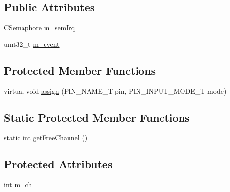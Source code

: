\subsection*{Public Attributes}
\begin{DoxyCompactItemize}
\item 
\hyperlink{class_c_semaphore}{C\-Semaphore} \hyperlink{class_c_pin_i_n_t_a183f478d30ac65d5a3e85c7939db044e}{m\-\_\-sem\-Irq}
\item 
uint32\-\_\-t \hyperlink{class_c_pin_i_n_t_a53b3ac0896504d345f4b6093cb22f3f3}{m\-\_\-event}
\end{DoxyCompactItemize}
\subsection*{Protected Member Functions}
\begin{DoxyCompactItemize}
\item 
virtual void \hyperlink{class_c_pin_i_n_t_a762631f4e29ba2f09257af8892f8777e}{assign} (P\-I\-N\-\_\-\-N\-A\-M\-E\-\_\-\-T pin, P\-I\-N\-\_\-\-I\-N\-P\-U\-T\-\_\-\-M\-O\-D\-E\-\_\-\-T mode)
\end{DoxyCompactItemize}
\subsection*{Static Protected Member Functions}
\begin{DoxyCompactItemize}
\item 
static int \hyperlink{class_c_pin_i_n_t_ac638835b5fd1ca3f7c29af36677e2b0a}{get\-Free\-Channel} ()
\end{DoxyCompactItemize}
\subsection*{Protected Attributes}
\begin{DoxyCompactItemize}
\item 
int \hyperlink{class_c_pin_i_n_t_a563b913b2126f003c0e1e2f3400a2ed2}{m\-\_\-ch}
\end{DoxyCompactItemize}


